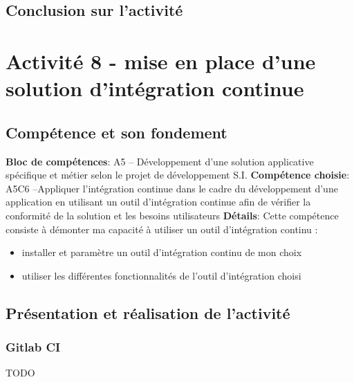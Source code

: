 \documentclass[a4paper, 11pt]{report}
\begin{document}
\subsection{Conclusion sur l'activité}

\section{Activité 8 - mise en place d’une solution d’intégration continue}
\subsection{Compétence et son fondement}
\textbf{Bloc de compétences}: A5 – Développement d’une solution applicative spécifique et métier selon le projet de développement S.I.
\newline
\textbf{Compétence choisie}: A5C6 –Appliquer l’intégration continue dans le cadre du développement d’une application en utilisant un outil d’intégration continue afin de vérifier la conformité de la solution et les besoins utilisateurs
\newline
\textbf{Détails}: Cette compétence consiste à démonter ma capacité à utiliser un outil d’intégration continu :
\begin{itemize}
  \item installer et paramètre un outil d’intégration continu de mon choix
  \item utiliser les différentes fonctionnalités de l’outil d’intégration choisi
\end{itemize}
\subsection{Présentation et réalisation de l'activité}
\subsubsection{Gitlab CI}
TODO
\end{document}
